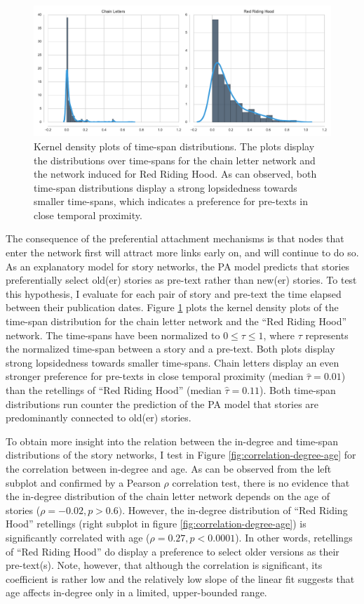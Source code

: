 \begin{figure}
\centering
\includegraphics[width=\textwidth]{images/attachment.pdf}
\caption{Kernel density plots of time-span distributions. The plots display the distributions over time-spans for the chain letter network and the network induced for Red Riding Hood. As can observed, both time-span distributions display a strong lopsidedness towards smaller time-spans, which indicates a preference for pre-texts in close temporal proximity.}
\label{fig:time-attachment}
\end{figure}

The consequence of the preferential attachment mechanisms is that nodes that enter the network first will attract more links early on, and will continue to do so. As an explanatory model for story networks, the PA model predicts that stories preferentially select old(er) stories as pre-text rather than new(er) stories. To test this hypothesis, I evaluate for each pair of story and pre-text the time elapsed between their publication dates. Figure \ref{fig:time-attachment} plots the kernel density plots of the time-span distribution for the chain letter network and the ``Red Riding Hood'' network. The time-spans have been normalized to $0 \leq \tau \leq 1$, where $\tau$ represents the normalized time-span between a story and a pre-text. Both plots display strong lopsidedness towards smaller time-spans. Chain letters display an even stronger preference for pre-texts in close temporal proximity (median $\hat{\tau}=0.01$) than the retellings of ``Red Riding Hood'' (median $\hat{\tau}=0.11$). Both time-span distributions run counter the prediction of the PA model that stories are predominantly connected to old(er) stories. 

To obtain more insight into the relation between the in-degree and time-span distributions of the story networks, I test in Figure \ref{fig:correlation-degree-age} for the correlation between in-degree and age. As can be observed from the left subplot and confirmed by a Pearson $\rho$ correlation test, there is no evidence that the in-degree distribution of the chain letter network depends on the age of stories ($\rho=-0.02, p > 0.6)$. However, the in-degree distribution of ``Red Riding Hood'' retellings (right subplot in figure \ref{fig:correlation-degree-age}) is significantly correlated with age ($\rho=0.27, p < 0.0001$). In other words, retellings of ``Red Riding Hood'' do display a preference to select older versions as their pre-text(s). Note, however, that although the correlation is significant, its coefficient is rather low and the relatively low slope of the linear fit suggests that age affects in-degree only in a limited, upper-bounded range.

